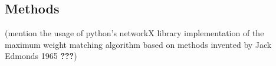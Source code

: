 \documentclass{bioinfo}
\begin{document}


\begin{methods}
\section{Methods}

(mention the usage of python's networkX library implementation of the maximum weight matching algorithm based on methods invented by Jack Edmonds 1965 \textbf{???})









\end{methods}
\end{document}
